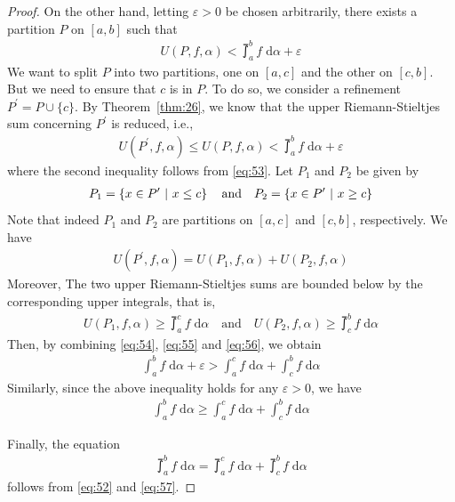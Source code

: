 \documentclass[thmcnt=section, 12pt]{my-elegantbook}
\begin{document}
\begin{proof}
    On the other hand, letting $\varepsilon > 0$ be chosen arbitrarily, there exists a partition $P$ on $[a, b]$ such that
    \begin{align}
        U(P,f,\alpha) < \upint_a^b f \; \mathrm{d}\alpha + \varepsilon
        \label{eq:53}
    \end{align}
    We want to split $P$ into two partitions, one on $[a,c]$ and the other on $[c, b]$. But we need to ensure that $c$ is in $P$. To do so, we consider a refinement $P^\prime = P \cup \{c\}$. By Theorem~\ref{thm:26}, we know that the upper Riemann-Stieltjes sum concerning $P^\prime$ is reduced, i.e.,
    \begin{align}
        U(P^\prime,f,\alpha) \leq U(P,f,\alpha) < \upint_a^b f \; \mathrm{d}\alpha + \varepsilon
        \label{eq:54}
    \end{align}
    where the second inequality follows from \eqref{eq:53}. Let $P_1$ and $P_2$ be given by
    \begin{align*}
        P_1 = \left\{ x \in P^\prime \ \middle| \ x \leq c \right\}
        \quad \text{and} \quad
        P_2 = \left\{ x \in P^\prime \ \middle| \ x \geq c \right\}
    \end{align*}
    Note that indeed $P_1$ and $P_2$ are partitions on $[a, c]$ and $[c, b]$, respectively. We have
    \begin{align}
        U(P^\prime,f,\alpha) = U(P_1,f,\alpha) + U(P_2,f,\alpha)
        \label{eq:55}
    \end{align}
    Moreover, The two upper Riemann-Stieltjes sums are bounded below by the corresponding upper integrals, that is,
    \begin{align}
        U(P_1,f,\alpha) \geq \upint_a^c f \; \mathrm{d}\alpha
        \quad\text{and}\quad
        U(P_2,f,\alpha) \geq \upint_c^b f \; \mathrm{d}\alpha
        \label{eq:56}
    \end{align}
    Then, by combining \eqref{eq:54}, \eqref{eq:55} and \eqref{eq:56}, we obtain
    \begin{align*}
        \int_a^b f \; \mathrm{d}\alpha + \varepsilon
        > \int_a^c f \; \mathrm{d}\alpha
        + \int_c^b f \; \mathrm{d}\alpha
    \end{align*}
    Similarly, since the above inequality holds for any $\varepsilon > 0$, we have
    \begin{align}
        \int_a^b f \; \mathrm{d}\alpha
        \geq \int_a^c f \; \mathrm{d}\alpha
        + \int_c^b f \; \mathrm{d}\alpha
        \label{eq:57}
    \end{align}

    Finally, the equation
    \begin{align*}
        \upint_a^b f \; \mathrm{d}\alpha = \upint_a^c f \; \mathrm{d}\alpha + \upint_c^b f \; \mathrm{d}\alpha
    \end{align*}
    follows from \eqref{eq:52} and \eqref{eq:57}.
\end{proof}
\end{document}
